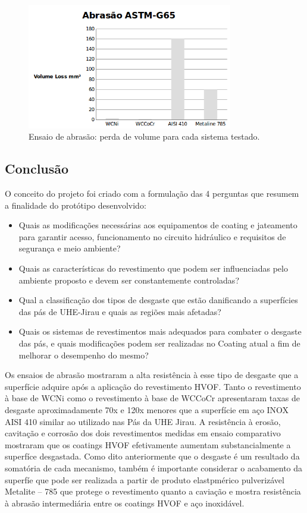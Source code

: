 \begin{figure}[h!]
\centering
\includegraphics[width=0.8\textwidth]{method/figs/ensaio_abrasao}
\caption{Ensaio de abrasão: perda de volume para cada sistema testado.}
\label{fig:ensaio_abrasao}

\end{figure}


\subsection{Conclusão}
O conceito do projeto foi criado com a formulação das 4 perguntas que resumem a
finalidade do protótipo desenvolvido:

\begin{itemize}
  \item Quais as modificações necessárias aos equipamentos  de coating e
  jateamento para garantir acesso, funcionamento no circuito hidráulico e
  requisitos de segurança e meio ambiente?
  \item Quais as características do revestimento que podem ser influenciadas
  pelo ambiente proposto e devem ser constantemente controladas?
  \item Qual a classificação dos tipos de desgaste que estão danificando a
  superfícies das pás de UHE-Jirau e quais as regiões mais afetadas?
  \item Quais os sistemas de revestimentos mais adequados para combater o
  desgaste das pás, e quais modificações podem ser realizadas no Coating atual a
  fim de melhorar o desempenho do mesmo?
\end{itemize}

Os ensaios de abrasão mostraram a alta resistência à esse tipo de desgaste que a
superfície adquire após a aplicação do revestimento HVOF.  Tanto o revestimento
à base de WCNi como o revestimento à base de WCCoCr apresentaram taxas de
desgaste aproximadamente 70x e 120x menores que a superfície em aço INOX AISI
410 similar ao utilizado nas Pás da UHE Jirau. A resistência à erosão,
cavitação e corrosão dos dois revestimentos medidas em ensaio comparativo
mostraram que os coatings HVOF efetivamente aumentam substancialmente a
superfíce desgastada. Como dito anteriormente que o desgaste é um resultado da
somatória de cada mecanismo, também é importante considerar o acabamento da
superfíe que pode ser realizada a partir de produto elastpmérico pulverizável
Metalite – 785 que protege o revestimento quanto a caviação e mostra
resistência à abrasão intermediária entre os coatings HVOF e aço inoxidável.

